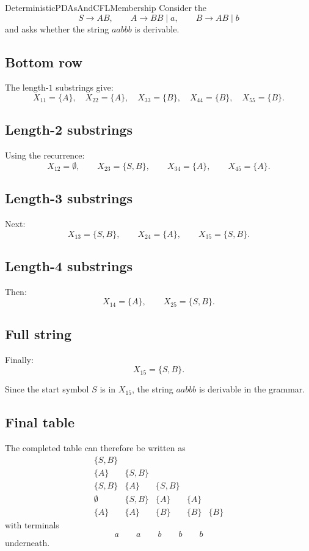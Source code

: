 \documentclass[hidelinks]{article}
\begin{document}
\begin{smodule}[title={Deterministic PDAs and CFL Membership}]{DeterministicPDAsAndCFLMembership}
Consider the 
\[
S \to AB,
\qquad
A \to BB \mid a,
\qquad
B \to AB \mid b
\]
and asks whether the string $aabbb$ is derivable.

\subsection{Bottom row}

The length-$1$ substrings give:
\[
X_{11} = \{A\},
\quad
X_{22} = \{A\},
\quad
X_{33} = \{B\},
\quad
X_{44} = \{B\},
\quad
X_{55} = \{B\}.
\]

\subsection{Length-2 substrings}

Using the recurrence:
\[
X_{12} = \emptyset,
\qquad
X_{23} = \{S,B\},
\qquad
X_{34} = \{A\},
\qquad
X_{45} = \{A\}.
\]

\subsection{Length-3 substrings}

Next:
\[
X_{13} = \{S,B\},
\qquad
X_{24} = \{A\},
\qquad
X_{35} = \{S,B\}.
\]

\subsection{Length-4 substrings}

Then:
\[
X_{14} = \{A\},
\qquad
X_{25} = \{S,B\}.
\]

\subsection{Full string}

Finally:
\[
X_{15} = \{S,B\}.
\]

Since the start symbol $S$ is in $X_{15}$, the string $aabbb$ is derivable in the grammar.

\subsection{Final table}

The completed table can therefore be written as
\[
\begin{array}{ccccc}
\{S,B\} \\
\{A\} & \{S,B\} \\
\{S,B\} & \{A\} & \{S,B\} \\
\emptyset & \{S,B\} & \{A\} & \{A\} \\
\{A\} & \{A\} & \{B\} & \{B\} & \{B\}
\end{array}
\]
with terminals
\[
a \qquad a \qquad b \qquad b \qquad b
\]
underneath.


\end{smodule}
\end{document}
